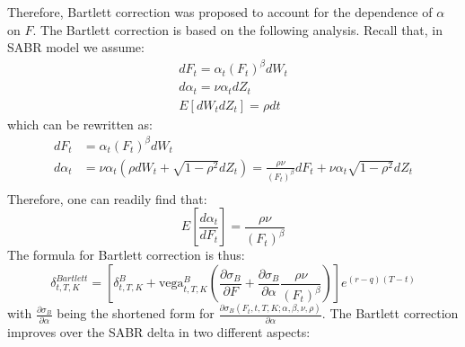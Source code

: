 \documentclass[letterpaper,12pt,titlepage,oneside,final]{book}
\numberwithin{equation}{section}
\theoremstyle{definition}
\begin{document}
Therefore, Bartlett correction \cite{hagan2017bartlett,bartlett2006hedging} was proposed to account for the dependence of $\alpha$ on $F$.
The Bartlett correction is based on the following analysis. Recall that, in SABR model we assume:
\[
\begin{split}
dF_t=\alpha_t (F_t)^{\beta}dW_t\\
d\alpha_t=\nu \alpha_t dZ_t\\
E[dW_tdZ_t]=\rho dt
\end{split}
\]
which can be rewritten as:
\[
\begin{split}
dF_t&=\alpha_t (F_t)^{\beta}dW_t\\
d\alpha_t&=\nu \alpha_t \left(\rho dW_t +\sqrt{1-\rho^2} dZ_t\right)=\frac{\rho \nu }{(F_t)^{\beta}}dF_t+\nu \alpha_t \sqrt{1-\rho^2} dZ_t\\
\end{split}
\]
Therefore, one can readily find that:
\[
   E\left[ \frac{d\alpha_t}{dF_t}\right] =\frac{\rho \nu }{(F_t)^{\beta}}
\]
The formula for Bartlett correction is thus:
\begin{equation}
\delta^{Bartlett}_{t,T,K}=\left[ 
    \delta^{B}_{t,T,K}+\text{vega}^{B}_{t,T,K} 
    \left(\frac{\partial \sigma_B}{\partial F}+ \frac{\partial \sigma_B}{\partial \alpha}\frac{\rho \nu }{(F_t)^{\beta}}\right)
\right]e^{(r-q) (T-t)}
\label{eq:bartlett}
\end{equation}
with $\frac{\partial \sigma_B}{\partial \alpha}$ being the shortened form for 
$\frac{\partial \sigma_B (F_t,t,T,K;\alpha,\beta,\nu,\rho)}{\partial \alpha}$.
The Bartlett correction improves over the SABR delta in two different aspects:
\end{document}
